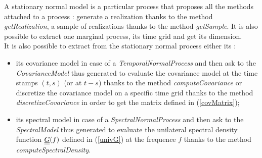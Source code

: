 \renewcommand{\filename}{docUC_StocProc_NormalProcess_Manipulation.tex}
\renewcommand{\filetitle}{UC : Manipulation of a stationary normal process}

\HeaderIIILevel



A stationary normal model is a particular process that proposes all the methods attached to a process : generate  a realization thanks to the method \emph{getRealization}, a sample of realizations thanks to the method \emph{getSample}. It is also possible to extract one marginal process, its time grid and get its dimension.\\

It is also possible to extract from the stationary normal process either its : 
\begin{itemize}
  \item its covariance model in case of a {\itshape TemporalNormalProcess} and then ask to the {\itshape CovarianceModel} thus generated to evaluate the covariance model  at the time stamps $(t,s)$ (or at $t-s$) thanks to the method \emph{computeCovariance} or discretize  the covariance model on a specific time grid thanks to the method \emph{discretizeCovariance} in order to get the matrix defined in (\ref{covMatrix});
  \item its spectral model in case of a {\itshape SpectralNormalProcess}  and then ask to the {\itshape SpectralModel} thus generated to evaluate the unilateral spectral density function ${\underline{\underline{G}}}(f)$ defined in (\ref{univG}) at the frequence $f$ thanks to the method \emph{computeSpectralDensity}.
\end{itemize}

